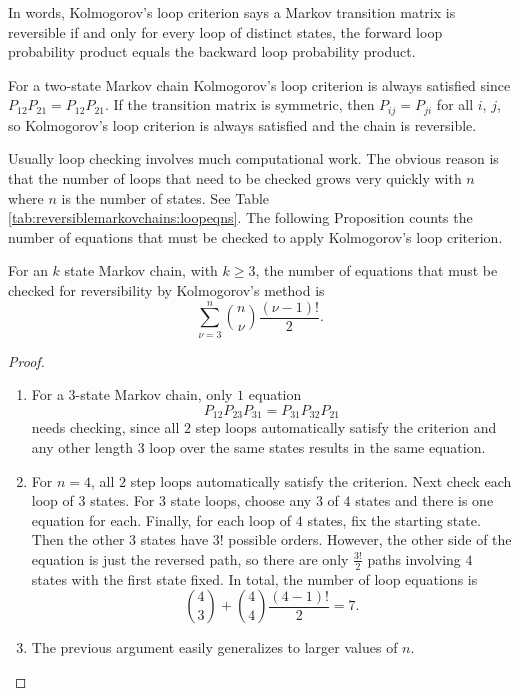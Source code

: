 \documentclass[12pt]{article}
\begin{document}
\begin{remark}
    In words, Kolmogorov's loop criterion says a Markov transition
    matrix is reversible if and only for every loop of distinct states,
    the forward loop probability product equals the backward loop
    probability product.
\end{remark}

For a two-state Markov chain Kolmogorov's loop criterion is always
satisfied since \( P_{12} P_{21} = P_{12} P_{21} \).  If the transition
matrix is symmetric, then \( P_{ij} = P_{ji} \) for all \( i \), \( j \),
so Kolmogorov's loop criterion is always satisfied and the chain is
reversible.

Usually loop checking involves much computational work.  The obvious
reason is that the number of loops that need to be checked grows very
quickly with \( n \) where \( n \) is the number of states.  See Table~%
\ref{tab:reversiblemarkovchains:loopeqns}.  The following Proposition
counts the number of equations that must be checked to apply
Kolmogorov's loop criterion.

\begin{proposition}
    For an \( k \) state Markov chain, with \( k \ge 3 \), the number of
    equations that must be checked for reversibility by Kolmogorov's
    method is
    \[
        \sum_{\nu=3}^n \binom{n}{\nu} \frac{(\nu-1)!}{2}.
    \]
\end{proposition}

\begin{proof}
    \begin{enumerate}
        \item
            For a \( 3 \)-state Markov chain, only \( 1 \) equation
            \[
                P_{12}P_{23}P_{31} = P_{31} P_{32} P_{21}
            \] needs checking, since all \( 2 \) step loops
            automatically satisfy the criterion and any other length \(
            3 \) loop over the same states results in the same equation.
        \item
            For \( n=4 \), all \( 2 \) step loops automatically satisfy
            the criterion.  Next check each loop of \( 3 \) states. For \(
            3 \) state loops, choose any \( 3 \) of \( 4 \) states and
            there is one equation for each.  Finally, for each loop of \(
            4 \) states, fix the starting state. Then the other \( 3 \)
            states have \( 3! \) possible orders. However, the other
            side of the equation is just the reversed path, so there are
            only \( \frac{3!}{2} \) paths involving \( 4 \) states with
            the first state fixed.  In total, the number of loop
            equations is
            \[
                \binom{4}{3} + \binom{4}{4} \frac{(4-1)!}{2} = 7.
            \]
        \item
            The previous argument easily generalizes to larger values of
            \( n \).
    \end{enumerate}
\end{proof}
\end{document}
